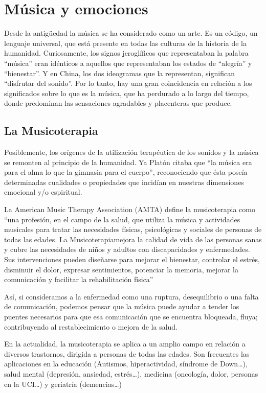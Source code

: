 \documentclass{bmcart}
\begin{document}
\section*{Música y emociones}
Desde la antigüedad la música se ha considerado como un arte. Es un código, un lenguaje universal, que está presente en todas las culturas de la historia de la humanidad. Curiosamente, los signos jeroglíficos que representaban la palabra “música” eran idénticos a aquellos que representaban los estados de “alegría” y “bienestar”. Y en China, los dos ideogramas que la representan, significan “disfrutar del sonido”. Por lo tanto, hay una gran coincidencia en relación a los significados sobre lo que es la música, que ha perdurado a lo largo del tiempo, donde predominan las sensaciones agradables y placenteras que produce.
\subsection*{La Musicoterapia}
Posiblemente, los orígenes de la utilización terapéutica de los sonidos y la música se remonten al principio de la humanidad. Ya Platón citaba que “la música era para el alma lo que la gimnasia para el cuerpo”, reconociendo que ésta poseía determinadas cualidades o propiedades que incidían en nuestras dimensiones emocional y/o espiritual.


La American Music Therapy Association (AMTA) define la musicoterapia como “una profesión, en el campo de la salud, que utiliza la música y actividades musicales para tratar las necesidades físicas, psicológicas y sociales de personas de todas las edades. La Musicoterapiamejora la calidad de vida de las personas sanas y cubre las necesidades de niños y adultos con discapacidades y enfermedades. Sus intervenciones pueden diseñarse para mejorar el bienestar, controlar el estrés, disminuir el dolor, expresar sentimientos, potenciar la memoria, mejorar la comunicación y facilitar la rehabilitación física”

Así, si consideramos a la enfermedad como una ruptura, desequilibrio o una falta de comunicación, podemos pensar que la música puede ayudar a tender los puentes necesarios para que esa comunicación que se encuentra bloqueada, fluya; contribuyendo al restablecimiento o mejora de la salud.

En la actualidad, la musicoterapia se aplica a un amplio campo en relación a diversos trastornos, dirigida a personas de todas las edades. Son frecuentes las aplicaciones en la educación (Autismos, hiperactividad, síndrome de Down…), salud mental (depresión, ansiedad, estrés…), medicina (oncología, dolor, personas en la UCI…) y geriatría (demencias…)
\end{document}
